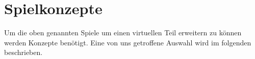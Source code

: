 \chapter{Spielkonzepte}

Um die oben genannten Spiele um einen virtuellen Teil erweitern zu können werden Konzepte benötigt. Eine von uns getroffene Auswahl wird im folgenden beschrieben. 







% 

% 

% 

% 

% 

% 

% 
\newpage